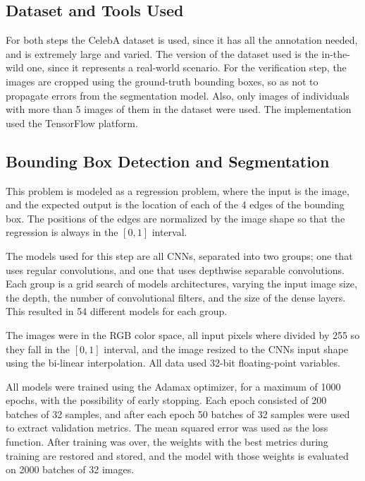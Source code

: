 \documentclass[runningheads]{llncs}
\begin{document}
\subsection{Dataset and Tools Used}

For both steps the CelebA\cite{liu2015faceattributes} dataset is used, since it has all the annotation needed, and is extremely large and varied. The version of the dataset used is the in-the-wild one, since it represents a real-world scenario. For the verification step, the images are cropped using the ground-truth bounding boxes, so as not to propagate errors from the segmentation model. Also, only images of individuals with more than 5 images of them in the dataset were used. The implementation used the TensorFlow\cite{tensorflow2015-whitepaper} platform.

\subsection{Bounding Box Detection and Segmentation}

This problem is modeled as a regression problem, where the input is the image, and the expected output is the location of each of the 4 edges of the bounding box. The positions of the edges are normalized by the image shape so that the regression is always in the $\left[0, 1\right]$ interval.

The models used for this step are all CNNs, separated into two groups; one that uses regular convolutions, and one that uses depthwise separable convolutions. Each group is a grid search of models architectures, varying the input image size, the depth, the number of convolutional filters, and the size of the dense layers. This resulted in 54 different models for each group.

The images were in the RGB color space, all input pixels where divided by 255 so they fall in the $\left[0, 1\right]$ interval, and the image resized to the CNNs input shape using the bi-linear interpolation. All data used 32-bit floating-point variables. 

All models were trained using the Adamax optimizer, for a maximum of 1000 epochs, with the possibility of early stopping. Each epoch consisted of 200 batches of 32 samples, and after each epoch 50 batches of 32 samples were used to extract validation metrics. The mean squared error was used as the loss function. After training was over, the weights with the best metrics during training are restored and stored, and the model with those weights is evaluated on 2000 batches of 32 images.
\end{document}
